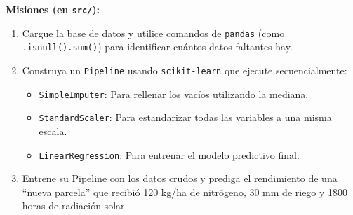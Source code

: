 \documentclass[12pt,a4paper]{article}
\begin{document}
\textbf{Misiones (en \texttt{src/}):}
\begin{enumerate}[label=\alph*)]
    \item Cargue la base de datos y utilice comandos de \texttt{pandas} (como \texttt{.isnull().sum()}) para identificar cuántos datos faltantes hay.
    \item Construya un \texttt{Pipeline} usando \texttt{scikit-learn} que ejecute secuencialmente:
    \begin{itemize}
        \item \texttt{SimpleImputer}: Para rellenar los vacíos utilizando la mediana.
        \item \texttt{StandardScaler}: Para estandarizar todas las variables a una misma escala.
        \item \texttt{LinearRegression}: Para entrenar el modelo predictivo final.
    \end{itemize}
    \item Entrene su Pipeline con los datos crudos y prediga el rendimiento de una ``nueva parcela'' que recibió 120 kg/ha de nitrógeno, 30 mm de riego y 1800 horas de radiación solar.



\end{enumerate}


\end{document}
